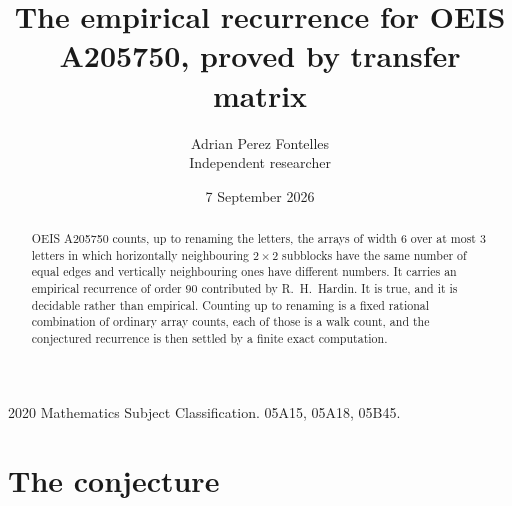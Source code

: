 \documentclass[11pt,a4paper]{article}
\title{The empirical recurrence for OEIS A205750, proved by transfer matrix}
\author{Adrian Perez Fontelles\\ \small Independent researcher}
\date{7 September 2026}
\theoremstyle{plain}
\theoremstyle{definition}
\begin{document}
\maketitle

\begin{abstract}
OEIS A205750 counts, up to renaming the letters, the arrays of width $6$ over at most $3$
letters in which horizontally neighbouring $2\times2$ subblocks have the same number of equal edges and vertically neighbouring ones have different numbers. It carries an empirical recurrence of order $90$ contributed by
R.~H.~Hardin. It is true, and it is decidable rather than empirical. Counting up to renaming is
a fixed rational combination of ordinary array counts, each of those is a walk count, and the
conjectured recurrence is then settled by a finite exact computation.
\end{abstract}

\noindent\small 2020 Mathematics Subject Classification. 05A15, 05A18, 05B45.\normalsize

\section{The conjecture}
\end{document}
